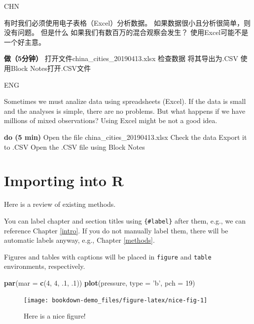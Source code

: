 \documentclass[]{book}
\newenvironment{Shaded}{\begin{snugshade}}{\end{snugshade}}
\newcommand{\DataTypeTok}[1]{\textcolor[rgb]{0.13,0.29,0.53}{#1}}
\newcommand{\DecValTok}[1]{\textcolor[rgb]{0.00,0.00,0.81}{#1}}
\newcommand{\FloatTok}[1]{\textcolor[rgb]{0.00,0.00,0.81}{#1}}
\newcommand{\KeywordTok}[1]{\textcolor[rgb]{0.13,0.29,0.53}{\textbf{#1}}}
\newcommand{\NormalTok}[1]{#1}
\newcommand{\StringTok}[1]{\textcolor[rgb]{0.31,0.60,0.02}{#1}}
\begin{document}
CHN

有时我们必须使用电子表格（Excel）分析数据。 如果数据很小且分析很简单，则没有问题。 但是什么
如果我们有数百万的混合观察会发生？ 使用Excel可能不是一个好主意。

\textbf{做（5分钟）}
打开文件china\_cities\_20190413.xlsx
检查数据
将其导出为.CSV
使用Block Notes打开.CSV文件

ENG

Sometimes we must analize data using spreadsheets (Excel). If the data is small and the analyses is simple, there are no problems. But what
happens if we have millions of mixed observations? Using Excel might be not a good idea.

\textbf{do (5 min)}
Open the file china\_cities\_20190413.xlsx
Check the data
Export it to .CSV
Open the .CSV file using Block Notes

\hypertarget{importing-into-r}{%
\section{Importing into R}\label{importing-into-r}}

Here is a review of existing methods.

You can label chapter and section titles using \texttt{\{\#label\}} after them, e.g., we can reference Chapter \ref{intro}. If you do not manually label them, there will be automatic labels anyway, e.g., Chapter \ref{methods}.

Figures and tables with captions will be placed in \texttt{figure} and \texttt{table} environments, respectively.

\begin{Shaded}
\begin{Highlighting}[]
\KeywordTok{par}\NormalTok{(}\DataTypeTok{mar =} \KeywordTok{c}\NormalTok{(}\DecValTok{4}\NormalTok{, }\DecValTok{4}\NormalTok{, }\FloatTok{.1}\NormalTok{, }\FloatTok{.1}\NormalTok{))}
\KeywordTok{plot}\NormalTok{(pressure, }\DataTypeTok{type =} \StringTok{'b'}\NormalTok{, }\DataTypeTok{pch =} \DecValTok{19}\NormalTok{)}
\end{Highlighting}
\end{Shaded}

\begin{figure}

{\centering \texttt{[image: bookdown-demo\_files/figure-latex/nice-fig-1]} 

}

\caption{Here is a nice figure!}\label{fig:nice-fig}
\end{figure}
\end{document}
